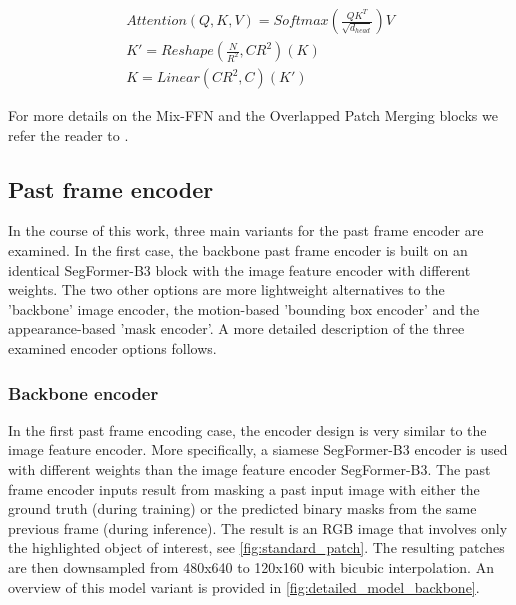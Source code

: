 \begin{gather}
    Attention(Q, K, V) = Softmax(\frac{QK^T}{\sqrt{d_{head}}})V \label{eq:eff1}\\
    K' = Reshape(\frac{N}{R^2}, C R^2)(K) \label{eq:eff2}\\
    K = Linear(C R^2, C)(K') \label{eq:eff3}
\end{gather}

For more details on the Mix-FFN and the Overlapped Patch Merging blocks we refer the reader to \parencite{segformer}.

\vspace{5mm}
\subsection{Past frame encoder}

In the course of this work, three main variants for the past frame encoder are examined. In the first case, the backbone 
past frame encoder is built on an identical SegFormer-B3 block with the image feature encoder with different weights. The two other options are more lightweight alternatives to the 'backbone' image encoder, the motion-based 'bounding box encoder' and the appearance-based 'mask encoder'. A more detailed description of the three examined encoder options follows.



\subsubsection{Backbone encoder}
In the first past frame encoding case, the encoder design is very similar to the image feature encoder. More specifically, a siamese SegFormer-B3 encoder is used with different weights than the image feature encoder SegFormer-B3. The past frame encoder inputs result from masking a past input image with either the ground truth (during training) or the predicted binary masks from the same previous frame (during inference). The result is an RGB image that involves only the highlighted object of interest, see \figref\ref{fig:standard_patch}. The resulting patches are then downsampled from 480x640 to 120x160 with bicubic interpolation. An overview of this model variant is provided in \figref\ref{fig:detailed_model_backbone}.

